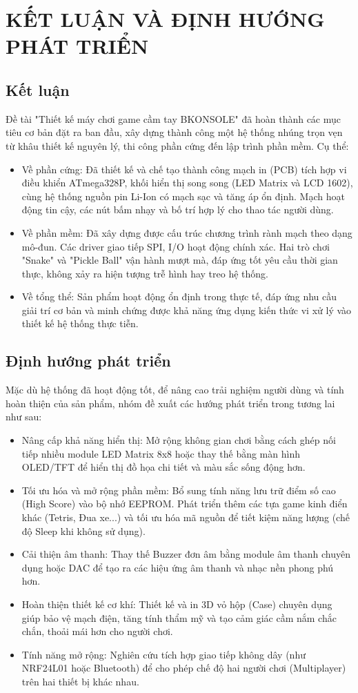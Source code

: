 \section{KẾT LUẬN VÀ ĐỊNH HƯỚNG PHÁT TRIỂN}
\subsection{Kết luận}
Đề tài "Thiết kế máy chơi game cầm tay BKONSOLE" đã hoàn thành các mục tiêu cơ bản đặt ra ban đầu, xây dựng thành công một hệ thống nhúng trọn vẹn từ khâu thiết kế nguyên lý, thi công phần cứng đến lập trình phần mềm. Cụ thể:
\begin{itemize}
    \item Về phần cứng: Đã thiết kế và chế tạo thành công mạch in (PCB) tích hợp vi điều khiển ATmega328P, khối hiển thị song song (LED Matrix và LCD 1602), cùng hệ thống nguồn pin Li-Ion có mạch sạc và tăng áp ổn định. Mạch hoạt động tin cậy, các nút bấm nhạy và bố trí hợp lý cho thao tác người dùng.
    \item Về phần mềm: Đã xây dựng được cấu trúc chương trình rành mạch theo dạng mô-đun. Các driver giao tiếp SPI, I/O hoạt động chính xác. Hai trò chơi "Snake" và "Pickle Ball" vận hành mượt mà, đáp ứng tốt yêu cầu thời gian thực, không xảy ra hiện tượng trễ hình hay treo hệ thống.
    \item Về tổng thể: Sản phẩm hoạt động ổn định trong thực tế, đáp ứng nhu cầu giải trí cơ bản và minh chứng được khả năng ứng dụng kiến thức vi xử lý vào thiết kế hệ thống thực tiễn.
\end{itemize}
\subsection{Định hướng phát triển}
Mặc dù hệ thống đã hoạt động tốt, để nâng cao trải nghiệm người dùng và tính hoàn thiện của sản phẩm, nhóm đề xuất các hướng phát triển trong tương lai như sau:
\begin{itemize}
    \item Nâng cấp khả năng hiển thị: Mở rộng không gian chơi bằng cách ghép nối tiếp nhiều module LED Matrix 8x8 hoặc thay thế bằng màn hình OLED/TFT để hiển thị đồ họa chi tiết và màu sắc sống động hơn.
    \item Tối ưu hóa và mở rộng phần mềm: Bổ sung tính năng lưu trữ điểm số cao (High Score) vào bộ nhớ EEPROM. Phát triển thêm các tựa game kinh điển khác (Tetris, Đua xe...) và tối ưu hóa mã nguồn để tiết kiệm năng lượng (chế độ Sleep khi không sử dụng).
    \item Cải thiện âm thanh: Thay thế Buzzer đơn âm bằng module âm thanh chuyên dụng hoặc DAC để tạo ra các hiệu ứng âm thanh và nhạc nền phong phú hơn.
    \item Hoàn thiện thiết kế cơ khí: Thiết kế và in 3D vỏ hộp (Case) chuyên dụng giúp bảo vệ mạch điện, tăng tính thẩm mỹ và tạo cảm giác cầm nắm chắc chắn, thoải mái hơn cho người chơi.
    \item Tính năng mở rộng: Nghiên cứu tích hợp giao tiếp không dây (như NRF24L01 hoặc Bluetooth) để cho phép chế độ hai người chơi (Multiplayer) trên hai thiết bị khác nhau.
\end{itemize}
